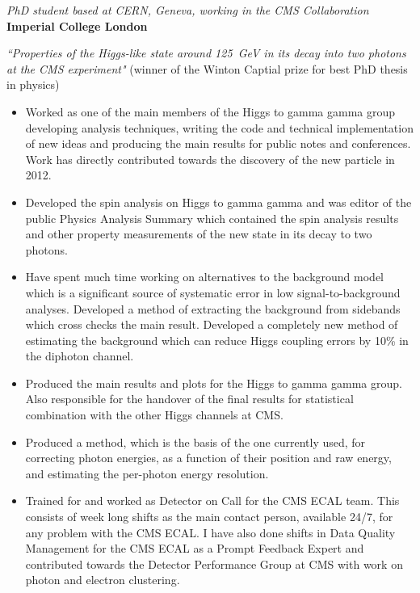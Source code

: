 \documentclass[margin, 10pt]{res} %
\begin{document}
\begin{resume}
{\sl PhD student based at CERN, Geneva, working in the CMS Collaboration}\\%
{\bf Imperial College London}

 {\sl ``Properties of the Higgs-like state around 125~GeV in its decay into two photons at the CMS experiment"} (winner of the Winton Captial prize for best PhD thesis in physics) \\

\begin{itemize} \itemsep -2pt %
\item Worked as one of the main members of the Higgs to gamma gamma group developing analysis techniques, writing the
code and technical implementation of new ideas and producing the main results for public notes and conferences.
Work has directly contributed towards the discovery of the new particle in 2012.
\item Developed the spin analysis on Higgs to gamma gamma and was editor of the public Physics Analysis Summary which contained the spin analysis results and other property measurements of the new state in its decay to two photons.
\item Have spent much time working on alternatives to the background model which is a significant source of systematic error in low signal-to-background analyses. Developed a method of extracting the background from sidebands which cross checks the main result. Developed a completely new method of estimating the background which can reduce Higgs coupling errors by 10\% in the diphoton channel.
\item Produced the main results and plots for the Higgs to gamma gamma group. Also responsible for the handover of
the final results for statistical combination with the other Higgs channels at CMS.
\item Produced a method, which is the basis of the one currently used, for correcting photon energies, as a function of their position and raw energy, and estimating the per-photon energy resolution.
\item Trained for and worked as Detector on Call for the CMS ECAL team. This consists of week long shifts as the main contact person, available 24/7, for any problem with the CMS ECAL. I have also done shifts in Data Quality Management for the CMS ECAL as a Prompt Feedback Expert and contributed towards the Detector Performance Group at CMS with work on photon and electron clustering.
\end{itemize}


\end{resume}
\end{document}
